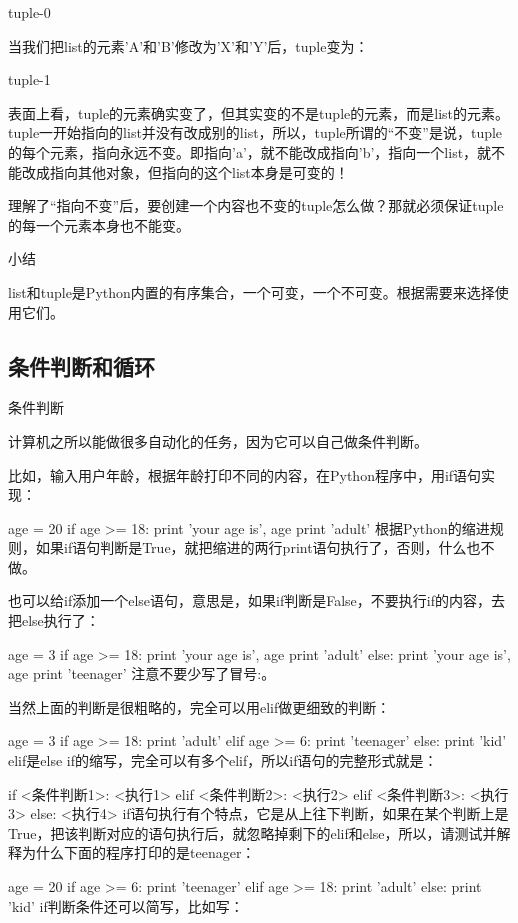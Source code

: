 \documentclass[10pt,a4paper]{ctexbook}
\begin{document}
tuple-0

当我们把list的元素'A'和'B'修改为'X'和'Y'后，tuple变为：

tuple-1

表面上看，tuple的元素确实变了，但其实变的不是tuple的元素，而是list的元素。tuple一开始指向的list并没有改成别的list，所以，tuple所谓的“不变”是说，tuple的每个元素，指向永远不变。即指向'a'，就不能改成指向'b'，指向一个list，就不能改成指向其他对象，但指向的这个list本身是可变的！

理解了“指向不变”后，要创建一个内容也不变的tuple怎么做？那就必须保证tuple的每一个元素本身也不能变。

小结

list和tuple是Python内置的有序集合，一个可变，一个不可变。根据需要来选择使用它们。




\subsection{条件判断和循环}
条件判断

计算机之所以能做很多自动化的任务，因为它可以自己做条件判断。

比如，输入用户年龄，根据年龄打印不同的内容，在Python程序中，用if语句实现：

age = 20
if age >= 18:
    print 'your age is', age
    print 'adult'
根据Python的缩进规则，如果if语句判断是True，就把缩进的两行print语句执行了，否则，什么也不做。

也可以给if添加一个else语句，意思是，如果if判断是False，不要执行if的内容，去把else执行了：

age = 3
if age >= 18:
    print 'your age is', age
    print 'adult'
else:
    print 'your age is', age
    print 'teenager'
注意不要少写了冒号:。

当然上面的判断是很粗略的，完全可以用elif做更细致的判断：

age = 3
if age >= 18:
    print 'adult'
elif age >= 6:
    print 'teenager'
else:
    print 'kid'
elif是else if的缩写，完全可以有多个elif，所以if语句的完整形式就是：

if <条件判断1>:
    <执行1>
elif <条件判断2>:
    <执行2>
elif <条件判断3>:
    <执行3>
else:
    <执行4>
if语句执行有个特点，它是从上往下判断，如果在某个判断上是True，把该判断对应的语句执行后，就忽略掉剩下的elif和else，所以，请测试并解释为什么下面的程序打印的是teenager：

age = 20
if age >= 6:
    print 'teenager'
elif age >= 18:
    print 'adult'
else:
    print 'kid'
if判断条件还可以简写，比如写：
\end{document}
